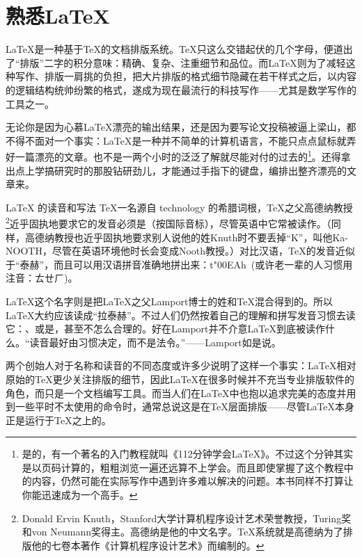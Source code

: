 \chapter{熟悉\LaTeX}
{\LaTeX}是一种基于{\TeX}的文档排版系统。{\TeX}只这么交错起伏的几个字母，便道出了“排版”二字的积分意味：精确、复杂、注重细节和品位。而{\LaTeX}则为了减轻这种写作、排版一肩挑的负担，把大片排版的格式细节隐藏在若干样式之后，以内容的逻辑结构统帅纷繁的格式，遂成为现在最流行的科技写作——尤其是数学写作的工具之一。

无论你是因为心慕{\LaTeX}漂亮的输出结果，还是因为要写论文投稿被逼上梁山，都不得不面对一个事实：{\LaTeX}是一种并不简单的计算机语言，不能只点点鼠标就弄好一篇漂亮的文章。也不是一两个小时的泛泛了解就尽能对付的过去的\footnote{是的，有一个著名的入门教程就叫《112分钟学会{\LaTeX}》。不过这个分钟其实是以页码计算的，粗粗浏览一遍还远算不上学会。而且即使掌握了这个教程中的内容，仍然可能在实际写作中遇到许多难以解决的问题。本书同样不打算让你能迅速成为一个高手。}。还得拿出点上学搞研究时的那股钻研劲儿，才能通过手指下的键盘，编排出整齐漂亮的文章来。

\begin{extread}{\LaTeX{} 的读音和写法}
    \TeX 一名源自 technology 的希腊词根\greektex，\TeX 之父高德纳教授\footnote{Donald Ervin Knuth，Stanford大学计算机程序设计艺术荣誉教授，Turing奖和von Neumann奖得主。高德纳是他的中文名字。\TeX 系统就是高德纳为了排版他的七卷本著作《计算机程序设计艺术》而编制的。}近乎固执地要求它的发音必须是（按国际音标）\textipa{[tEx]}，尽管英语中它常被读作\textipa{[tEk]}。（同样，高德纳教授也近乎固执地要求别人说他的姓Knuth时不要丢掉“K”，叫他Ka-NOOTH，尽管在英语环境他时长会变成Nooth教授。）对比汉语，\TeX 的发音近似于“泰赫”，而且可以用汉语拼音准确地拼出来：\textsf{t\char"00EAh}~(或许老一辈的人习惯用注音：ㄊㄝㄏ)。
    
    \LaTeX 这个名字则是把\LaTeX 之父Lamport博士的姓和\TeX 混合得到的。所以\LaTeX 大约应该读成“拉泰赫”。不过人们仍然按着自己的理解和拼写发音习惯去读它：\textipa{["lA:tEk]}、\textipa{["leItEk]}或是\textipa{[lA:"tEk]}，甚至不怎么合理的\textipa{["leItEks]}。好在Lamport并不介意\LaTeX 到底被读作什么。“读音最好由习惯决定，而不是法令。”——Lamport如是说。
    
    两个创始人对于名称和读音的不同态度或许多少说明了这样一个事实：\LaTeX 相对原始的\TeX 更少关注排版的细节，因此\LaTeX 在很多时候并不充当专业排版软件的角色，而只是一个文档编写工具。而当人们在\LaTeX 中也抱以追求完美的态度并用到一些平时不太使用的命令时，通常总说这是在\TeX 层面排版——尽管\LaTeX 本身正是运行于\TeX 之上的。
    
\end{extread}

